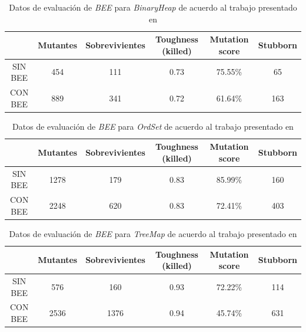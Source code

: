 \begin{table}[]
	\caption[Resultados de la evaluaci\'on de \emph{BEE} para \emph{BinaryHeap}]{Datos de evaluaci\'on de \emph{BEE} para \emph{BinaryHeap} de acuerdo al trabajo presentado en \cite{bibliography.mutation.operators.beeBridaS17}}
	\label{tables.examples.bee.paperResults.binaryheap}
	\centering
	\scriptsize
	\def\arraystretch{0.95}
	\setlength\tabcolsep{0.5mm}
	\begin{tabular}{c|ccccc|}
		\cline{2-6}
		& Mutantes & Sobrevivientes & Toughness (killed) & Mutation score & Stubborn \\ \hline
		\multicolumn{1}{|c|}{SIN BEE} & 454 & 111 & 0.73 & 75.55\% & 65 \\ \hline
		\multicolumn{1}{|c|}{CON BEE} & 889 & 341 & 0.72 & 61.64\% & 163 \\ \hline
	\end{tabular}
\end{table}

\begin{table}[]
	\caption[Resultados de la evaluaci\'on de \emph{BEE} para \emph{OrdSet}]{Datos de evaluaci\'on de \emph{BEE} para \emph{OrdSet} de acuerdo al trabajo presentado en \cite{bibliography.mutation.operators.beeBridaS17}}
	\label{tables.examples.bee.paperResults.ordset}
	\centering
	\scriptsize
	\def\arraystretch{0.95}
	\setlength\tabcolsep{0.5mm}
	\begin{tabular}{c|ccccc|}
		\cline{2-6}
		& Mutantes & Sobrevivientes & Toughness (killed) & Mutation score & Stubborn \\ \hline
		\multicolumn{1}{|c|}{SIN BEE} & 1278 & 179 & 0.83 & 85.99\% & 160 \\ \hline
		\multicolumn{1}{|c|}{CON BEE} & 2248 & 620 & 0.83 & 72.41\% & 403 \\ \hline
	\end{tabular}
\end{table}

\begin{table}[]
	\caption[Resultados de la evaluaci\'on de \emph{BEE} para \emph{TreeMap}]{Datos de evaluaci\'on de \emph{BEE} para \emph{TreeMap} de acuerdo al trabajo presentado en \cite{bibliography.mutation.operators.beeBridaS17}}
	\label{tables.examples.bee.paperResults.treemap}
	\centering
	\scriptsize
	\def\arraystretch{0.95}
	\setlength\tabcolsep{0.5mm}
	\begin{tabular}{c|ccccc|}
		\cline{2-6}
		& Mutantes & Sobrevivientes & Toughness (killed) & Mutation score & Stubborn \\ \hline
		\multicolumn{1}{|c|}{SIN BEE} & 576 & 160 & 0.93 & 72.22\% & 114 \\ \hline
		\multicolumn{1}{|c|}{CON BEE} & 2536 & 1376 & 0.94 & 45.74\% & 631 \\ \hline
	\end{tabular}
\end{table}

